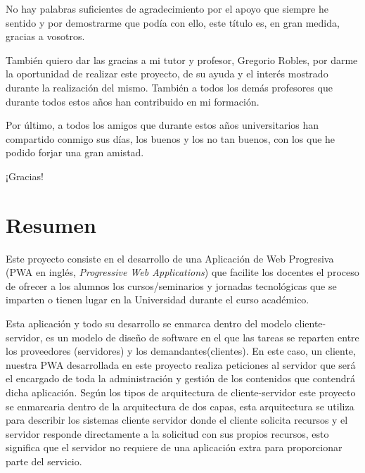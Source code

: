 \documentclass[a4paper, 12pt]{book}
\begin{document}
	No hay palabras suficientes de agradecimiento por el apoyo que siempre he sentido y por demostrarme que podía con ello, este título es, en gran medida, gracias a vosotros.

	También quiero dar las gracias a mi tutor y profesor, Gregorio Robles, por darme la oportunidad de realizar este proyecto, de su ayuda y el interés mostrado durante la realización del mismo.
También a todos los demás profesores que durante todos estos años han contribuido en mi formación.

	Por último, a todos los amigos que durante estos años universitarios han compartido conmigo sus días, los buenos y los no tan buenos, con los que he podido forjar una gran amistad.

	\vspace{5mm} %
	¡Gracias!



\chapter*{Resumen}

	Este proyecto consiste en el desarrollo de una Aplicación de Web Progresiva (PWA en inglés, \emph{Progressive Web Applications}) que facilite los docentes el proceso de ofrecer a los alumnos los cursos/seminarios y jornadas tecnológicas que se imparten o tienen lugar en la Universidad durante el curso académico.
	
	Esta aplicación y todo su desarrollo se enmarca dentro del modelo cliente-servidor, es un modelo de diseño de software en el que las tareas se reparten entre los proveedores (servidores) y los demandantes(clientes). En este caso, un cliente, nuestra PWA desarrollada en este proyecto realiza peticiones al servidor que será el encargado de toda la administración y gestión de los contenidos que contendrá dicha aplicación. Según los tipos de arquitectura de cliente-servidor este proyecto se enmarcaria dentro de la arquitectura de dos capas, esta arquitectura se utiliza para describir los sistemas cliente servidor donde el cliente solicita recursos y el servidor responde directamente a la solicitud con sus propios recursos, esto significa que el servidor no requiere de una aplicación extra para proporcionar parte del servicio.
	
\end{document}
